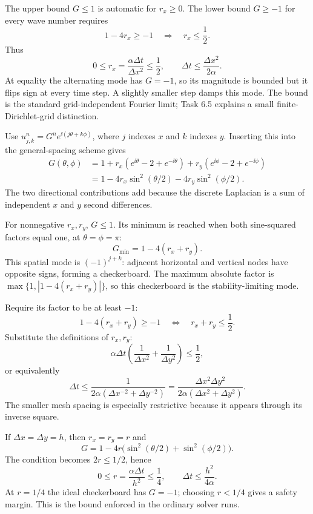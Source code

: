 The upper bound $G\le1$ is automatic for $r_x\ge0$. The lower bound $G\ge-1$ for every
wave number requires
\[
1-4r_x\ge-1
\quad\Longrightarrow\quad r_x\le\frac12.
\]
Thus
\[
\boxed{0\le r_x=\frac{\alpha\Delta t}{\Delta x^2}\le\frac12,
\qquad \Delta t\le\frac{\Delta x^2}{2\alpha}.}
\]
At equality the alternating mode has $G=-1$, so its magnitude is bounded but it flips sign
at every time step. A slightly smaller step damps this mode. The bound is the standard
grid-independent Fourier limit; Task 6.5 explains a small finite-Dirichlet-grid distinction.

Use $u_{j,k}^n=G^n e^{\ii(j\theta+k\phi)}$, where $j$ indexes $x$ and $k$ indexes $y$.
Inserting this into the general-spacing scheme gives
\begin{align*}
G(\theta,\phi)
&=1+r_x(e^{\ii\theta}-2+e^{-\ii\theta})
+r_y(e^{\ii\phi}-2+e^{-\ii\phi})\\
&=\boxed{1-4r_x\sin^2(\theta/2)-4r_y\sin^2(\phi/2).}
\end{align*}
The two directional contributions add because the discrete Laplacian is a sum of independent
$x$ and $y$ second differences.

For nonnegative $r_x,r_y$, $G\le1$. Its minimum is reached when both sine-squared factors
equal one, at $\theta=\phi=\pi$:
\[
G_{\min}=1-4(r_x+r_y).
\]
This spatial mode is $(-1)^{j+k}$: adjacent horizontal and vertical nodes have opposite signs,
forming a checkerboard. The maximum absolute factor is
$\max\{1,|1-4(r_x+r_y)|\}$, so this checkerboard is the stability-limiting mode.

Require its factor to be at least $-1$:
\[
1-4(r_x+r_y)\ge-1
\quad\Longleftrightarrow\quad r_x+r_y\le\frac12.
\]
Substitute the definitions of $r_x,r_y$:
\[
\boxed{\alpha\Delta t\left(\frac1{\Delta x^2}+\frac1{\Delta y^2}\right)\le\frac12,}
\]
or equivalently
\[
\boxed{\Delta t\le
\frac{1}{2\alpha(\Delta x^{-2}+\Delta y^{-2})}
=\frac{\Delta x^2\Delta y^2}{2\alpha(\Delta x^2+\Delta y^2)}.}
\]
The smaller mesh spacing is especially restrictive because it appears through its inverse square.

If $\Delta x=\Delta y=h$, then $r_x=r_y=r$ and
\[
G=1-4r\bigl(\sin^2(\theta/2)+\sin^2(\phi/2)\bigr).
\]
The condition becomes $2r\le1/2$, hence
\[
\boxed{0\le r=\frac{\alpha\Delta t}{h^2}\le\frac14,
\qquad \Delta t\le\frac{h^2}{4\alpha}.}
\]
At $r=1/4$ the ideal checkerboard has $G=-1$; choosing $r<1/4$ gives a safety margin.
This is the bound enforced in the ordinary solver runs.

